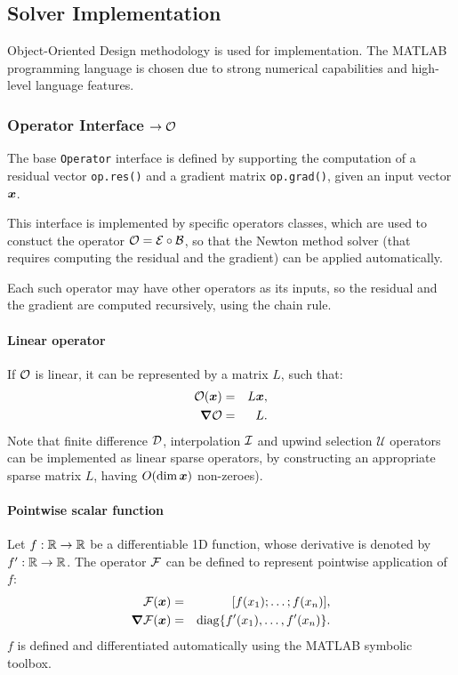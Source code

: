 \subsection{Solver Implementation}

Object-Oriented Design methodology is used for implementation.
The MATLAB programming language is chosen due to strong numerical capabilities
and high-level language features.

\subsubsection{Operator Interface $ \rightarrow \mathcal{O}$}
The base \verb|Operator| interface is defined by 
supporting the computation of a residual vector \verb|op.res()|
and a gradient matrix \verb|op.grad()|, given an input vector $\boldsymbol{x}$.

This interface is implemented by specific operators classes,
which are used to constuct the operator $\mathcal{O} = \mathcal{E} \circ \mathcal{B}$, so that 
the Newton method solver (that requires computing the residual and the gradient) 
can be applied automatically.

Each such operator may have other operators as its inputs, so the residual
and the gradient are computed recursively, using the chain rule.

\paragraph{Linear operator}
If $\mathcal{O}$ is linear, it can be represented by a matrix $L$, such that:
\begin{eqnarray}
\mathcal{O}(\boldsymbol{x}) &=& L \boldsymbol{x}, \\
\boldsymbol{\nabla}\mathcal{O} &=& L. 
\end{eqnarray}
Note that finite difference $\mathcal{D}$, interpolation $\mathcal{I}$ and 
upwind selection $\mathcal{U}$ operators
can be implemented as linear sparse operators, by constructing 
an appropriate sparse matrix $L$, having $O(\dim \boldsymbol{x})$ non-zeroes).

\paragraph{Pointwise scalar function}
Let $f: \mathbb{R} \rightarrow \mathbb{R}$ be a differentiable 1D function, whose derivative is
denoted by $f': \mathbb{R} \rightarrow \mathbb{R}$. The operator $\mathcal{F}$ can be defined to
represent pointwise application of $f$:
\begin{eqnarray}
\mathcal{F}(\boldsymbol{x}) &=& [f(x_1); \ldots; f(x_n)], \\
\boldsymbol{\nabla}\mathcal{F}(\boldsymbol{x}) &=& \mathrm{diag}\{f'(x_1), \ldots, f'(x_n)\}.
\end{eqnarray}
$f$ is defined and differentiated automatically using the MATLAB symbolic toolbox.

